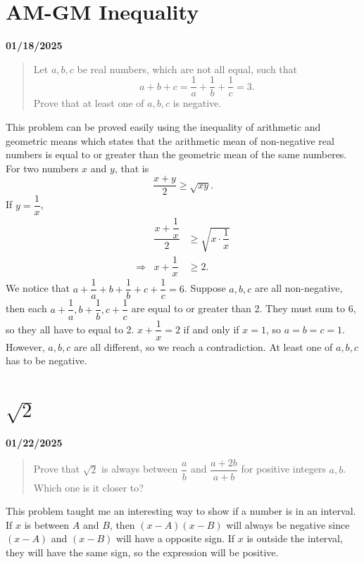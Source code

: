 \documentclass[12pt, oneside]{article}
\begin{document}
\section*{AM-GM Inequality}
\textbf{01/18/2025}
\begin{quote}
Let $a, b, c$ be real numbers, which are not all equal, such that
\[a + b + c = \frac{1}{a} + \frac{1}{b} + \frac{1}{c} = 3.\]
Prove that at least one of $a, b, c$ is negative.
\end{quote}
This problem can be proved easily using the inequality of arithmetic and geometric means which states that the arithmetic mean of non-negative real numbers is equal to or greater than the geometric mean of the same numberes. For two numbers $x$ and $y$, that is \[\frac{x+y}{2} \geq \sqrt{xy}.\] 
If $y=\dfrac{1}{x}$, 
\begin{eqnarray*}
&\dfrac{x+\dfrac{1}{x}}{2} &\geq \sqrt{x \cdot \dfrac{1}{x}}\\
\Rightarrow &x + \dfrac{1}{x} &\geq 2.
\end{eqnarray*}
We notice that $a + \dfrac{1}{a} + b + \dfrac{1}{b} + c + \dfrac{1}{c} = 6$. Suppose $a, b, c$ are all non-negative, then each $a + \dfrac{1}{a}, b + \dfrac{1}{b}, c + \dfrac{1}{c}$ are equal to or greater than 2. They must sum to 6, so they all have to equal to 2. $x+\dfrac{1}{x} = 2$ if and only if $x=1$, so $a=b=c=1$. However, $a, b, c$ are all different, so we reach a contradiction. At least one of $a, b, c$ has to be negative.
\section*{$\sqrt{2}$}
\textbf{01/22/2025}
\begin{quote}
Prove that $\sqrt{2}$ is always between $\dfrac{a}{b}$ and $\dfrac{a+2b}{a+b}$ for positive integers $a, b$. Which one is it closer to?
\end{quote}
This problem taught me an interesting way to show if a number is in an interval. If $x$ is between $A$ and $B$, then $(x-A)(x-B)$ will always be negative since $(x-A)$ and $(x-B)$ will have a opposite sign. If $x$ is outside the interval, they will have the same sign, so the expression will be positive.
\end{document}
